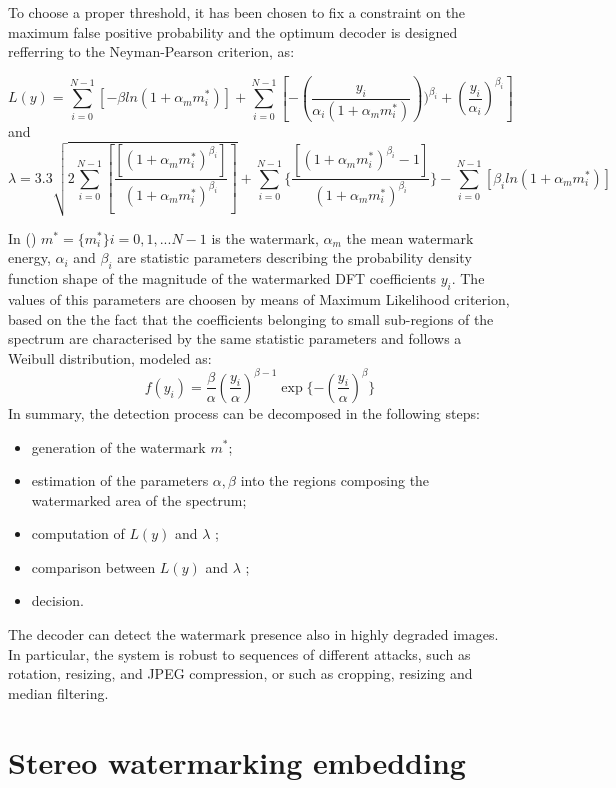To choose a proper threshold, it has been chosen to fix a constraint on the maximum false positive probability and the optimum decoder is designed refferring to the Neyman-Pearson criterion, as: \newline

$$ L(y)=\sum_{i=0}^{N-1} [-\beta ln(1+\alpha_{m}m_{i}^{*})]+\sum_{i=0}^{N-1}[-(\frac{y_{i}}{\alpha_{i}(1+\alpha_{m}m_{i}^{*})}))^{\beta_{i}}+(\frac{y_{i}}{\alpha_{i}})^{\beta_{i}}] $$
and
$$\lambda=3.3\sqrt{2\sum_{i=0}^{N-1}[\frac{[(1+\alpha_{m}m_{i}^{*})^{\beta_{i}}]}{(1+\alpha_{m}m_{i}^{*})^{\beta_{i}}}]} + \sum_{i=0}^{N-1}\{\frac{[(1+\alpha_{m}m_{i}^{*})^{\beta_{i}}-1]}{(1+\alpha_{m}m_{i}^{*})^{\beta_{i}}}\} - \sum_{i=0}^{N-1}[\beta_{i}ln(1+\alpha_{m}m_{i}^{*})]$$

In ()  $m^{*} = \{ m^{*}_{i} \} i= 0,1,...N-1$ is the watermark, $\alpha_{m}$ the mean watermark energy, $\alpha_{i}$ and $\beta_{i}$ are statistic parameters describing the probability density function shape of the magnitude of the watermarked DFT coefficients $y_{i}$.\newline 
The values of this parameters are choosen by means of Maximum Likelihood criterion, based on the the fact that the coefficients belonging to small
sub-regions of the spectrum are characterised by the same statistic parameters and follows a Weibull distribution, modeled as:
$$ f(y_{i}) = \frac{\beta}{\alpha}(\frac{y_{i}}{\alpha})^{\beta-1}\exp\{-(\frac{y_{i}}{\alpha})^{\beta}\}$$
In summary, the detection process can be decomposed in the following steps:
\begin{itemize}
\item generation of the watermark $m^{*}$;
\item estimation of the parameters $\alpha,\beta$ into the regions composing the watermarked area of the spectrum;
\item computation of $L(y)$ and $\lambda$ ;
\item comparison between $L(y)$ and $\lambda$ ;
\item decision.
\end{itemize}

The decoder can detect the watermark presence also in highly degraded images. In particular, the system is robust to sequences of different attacks, such as rotation, resizing, and JPEG compression, or such as cropping, resizing and median filtering.

\section{Stereo watermarking embedding}

